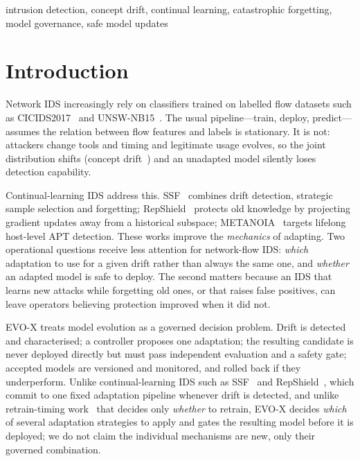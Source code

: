 \documentclass[conference]{IEEEtran}
\newcommand{\evox}{\textsc{EVO-X}}
\begin{document}
\begin{IEEEkeywords}
intrusion detection, concept drift, continual learning, catastrophic forgetting, model governance, safe model updates
\end{IEEEkeywords}

\section{Introduction}
Network IDS increasingly rely on classifiers trained on labelled flow datasets such as CICIDS2017~\cite{sharafaldin2018cicids} and UNSW-NB15~\cite{moustafa2015unsw}. The usual pipeline---train, deploy, predict---assumes the relation between flow features and labels is stationary. It is not: attackers change tools and timing and legitimate usage evolves, so the joint distribution shifts (concept drift~\cite{gama2014survey}) and an unadapted model silently loses detection capability.

Continual-learning IDS address this. SSF~\cite{zhang2024ssf} combines drift detection, strategic sample selection and forgetting; RepShield~\cite{liu2026repshield} protects old knowledge by projecting gradient updates away from a historical subspace; METANOIA~\cite{ying2025metanoia} targets lifelong host-level APT detection. These works improve the \emph{mechanics} of adapting. Two operational questions receive less attention for network-flow IDS: \emph{which} adaptation to use for a given drift rather than always the same one, and \emph{whether} an adapted model is safe to deploy. The second matters because an IDS that learns new attacks while forgetting old ones, or that raises false positives, can leave operators believing protection improved when it did not.

\evox{} treats model evolution as a governed decision problem. Drift is detected and characterised; a controller proposes one adaptation; the resulting candidate is never deployed directly but must pass independent evaluation and a safety gate; accepted models are versioned and monitored, and rolled back if they underperform. Unlike continual-learning IDS such as SSF~\cite{zhang2024ssf} and RepShield~\cite{liu2026repshield}, which commit to one fixed adaptation pipeline whenever drift is detected, and unlike retrain-timing work~\cite{pham2025retrain} that decides only \emph{whether} to retrain, \evox{} decides \emph{which} of several adaptation strategies to apply and gates the resulting model before it is deployed; we do not claim the individual mechanisms are new, only their governed combination.
\end{document}
